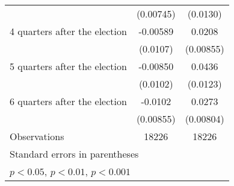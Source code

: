 \begin{table}[htbp]
\begin{tabular}{l*{2}{c}}
                    &   (0.00745)         &    (0.0130)         \\
[1em]
 4 quarters after the election&    -0.00589         &      0.0208\sym{*}  \\
                    &    (0.0107)         &   (0.00855)         \\
[1em]
 5 quarters after the election&    -0.00850         &      0.0436\sym{***}\\
                    &    (0.0102)         &    (0.0123)         \\
[1em]
 6 quarters after the election&     -0.0102         &      0.0273\sym{***}\\
                    &   (0.00855)         &   (0.00804)         \\
\hline
Observations        &       18226         &       18226         \\
\hline\hline
\multicolumn{3}{l}{\footnotesize Standard errors in parentheses}\\
\multicolumn{3}{l}{\footnotesize \sym{*} \(p<0.05\), \sym{**} \(p<0.01\), \sym{***} \(p<0.001\)}\\
\end{tabular}
\end{table}
